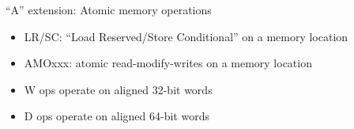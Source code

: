 \documentclass{article}
\newcommand{\hmmmm}{\hspace*{4em}}
\begin{document}
\begin{center}
  {\Huge
    ``A'' extension: Atomic memory operations}

  \vspace{0.2in}

  \begin{minipage}[t]{9in}
    \hmmmm {}

    \vspace{0.2in}

    \begin{itemize}\Large
    \item LR/SC: ``Load Reserved/Store Conditional'' on a memory location
    \item AMOxxx: atomic read-modify-writes on a memory location
    \item W ops operate on aligned 32-bit words
    \item D ops operate on aligned 64-bit words
    \end{itemize}
  \end{minipage}
\end{center}

\clearpage

\end{document}
